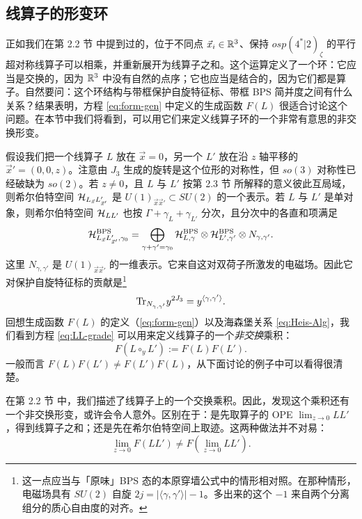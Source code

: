 \subsection{线算子的形变环}\label{subsec:Deformed-Ring}

正如我们在第 2.2 节%
中提到过的，位于不同点 $\vec x_i\in \mathbb{R}^3$、保持 $osp(4^*\vert 2)_\zeta$ 的平行超对称线算子可以相乘，并重新展开为线算子之和。这个运算定义了一个环：它应当是交换的，因为 $\mathbb{R}^3$ 中没有自然的点序；它也应当是结合的，因为它们都是算子。自然要问：这个环结构与带框保护自旋特征标、带框 BPS 简并度之间有什么关系？结果表明，方程 \eqref{eq:form-gen} 中定义的生成函数 $F(L)$ 很适合讨论这个问题。在本节中我们将看到，可以用它们来定义线算子环的一个非常有意思的非交换形变。

假设我们把一个线算子 $L$ 放在 $\vec x=0$，另一个 $L'$ 放在沿 $z$ 轴平移的 $\vec x' = (0,0,z)$。注意由 $J_3$ 生成的旋转是这个位形的对称性，但 $so(3)$ 对称性已经破缺为 $so(2)$。若 $z\ne 0$，且 $L$ 与 $L'$ 按第 2.3 节%
所解释的意义彼此互局域，则希尔伯特空间 $\mathcal{H}_{L_{\vec x} L'_{\vec x'}}$ 是 $U(1)_{\vec x \vec x'}\subset SU(2)$ 的一个表示。若 $L$ 与 $L'$ 是单对象，则希尔伯特空间 $\mathcal{H}_{LL'}$ 也按 $\Gamma + \gamma_L + \gamma_{L'}$ 分次，且分次中的各直和项满足
\begin{equation}\label{eq:LL-grade}
\mathcal{H}_{L_{\vec x} L'_{\vec x'},\gamma_0}^{\rm BPS} = \bigoplus_{\gamma+ \gamma'=\gamma_0} \mathcal{H}_{L,\gamma}^{\rm BPS}
 \otimes \mathcal{H}_{L',\gamma'}^{\rm BPS}
 \otimes N_{\gamma,\gamma'}.
\end{equation}
这里 $N_{\gamma,\gamma'}$ 是 $U(1)_{\vec x \vec x'}$ 的一维表示。它来自这对双荷子所激发的电磁场。因此它对保护自旋特征标的贡献是\footnote{这一点应当与「原味」BPS 态的本原穿墙公式中的情形相对照。在那种情形，电磁场具有 $SU(2)$ 自旋 $2j = \vert \langle \gamma, \gamma' \rangle \vert -1$。多出来的这个 $-1$ 来自两个分离组分的质心自由度的对齐。}
\begin{equation}
{\operatorname{Tr}}_{N_{\gamma,\gamma'}} y^{2J_3} = y^{\langle \gamma, \gamma' \rangle}.
\end{equation}
回想生成函数 $F(L)$ 的定义（\eqref{eq:form-gen}）以及海森堡关系 \eqref{eq:Heis-Alg}，我们看到方程 \eqref{eq:LL-grade} 可以用来定义线算子的一个\emph{非交换}乘积：
\begin{equation}\label{eq:Non-Comm-Line-Prod}
F(L\circ_y L') := F(L) F(L').
\end{equation}
一般而言 $F(L)F(L') \ne F(L') F(L)$，从下面讨论的例子中可以看得很清楚。

在第 2.2 节%
中，我们描述了线算子上的一个交换乘积。因此，发现这个乘积还有一个非交换形变，或许会令人意外。区别在于：是先取算子的 OPE $\lim_{z\to 0} LL'$，得到线算子之和；还是先在希尔伯特空间上取迹。这两种做法并不对易：
\begin{equation}
\lim_{z\to 0} F(LL')\ne F(\lim_{z\to 0} LL').
\end{equation}

